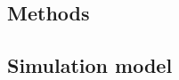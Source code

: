 \documentclass[]{article}
\begin{document}
\begin{doublespace}

\section{Methods}

\subsection{Simulation model}


\end{doublespace}
\end{document}

